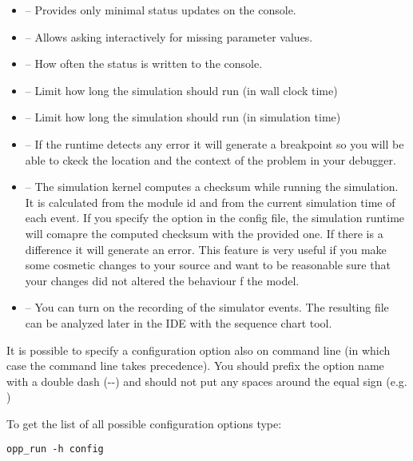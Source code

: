 \begin{itemize}
  \item {} -- Provides only minimal status updates on the console.
  \item {} -- Allows asking interactively for missing
        parameter values.
  \item {} -- How often the status is written to the console.
  \item {} -- Limit how long the simulation should run (in wall clock time)
  \item {} -- Limit how long the simulation should run (in simulation time)
  \item {} -- If the runtime detects any error it will generate a breakpoint
        so you will be able to ckeck the location and the context of the problem in your debugger.
  \item {} -- The simulation kernel computes a checksum while running the simulation.
          It is calculated from the module id and from the current simulation time of each event.
          If you specify the  option in the config file, the simulation runtime will
          comapre the computed checksum with the provided one. If there is a difference it will
          generate an error. This feature is very useful if you make some cosmetic changes to your
          source and want to be reasonable sure that your changes did not altered the behaviour
          f the model.
  \item {} -- You can turn on the recording of the simulator events. The
           resulting file can be analyzed later in the IDE with the sequence chart tool.
\end{itemize}

\begin{note}
  It is possible to specify a configuration option also on command line (in which case the
  command line takes precedence). You should prefix the option name with a double
  dash (-{}-) and should not put any spaces around the equal sign
  (e.g. )
\end{note}

To get the list of all possible configuration options type:

\begin{verbatim}
opp_run -h config
\end{verbatim}


